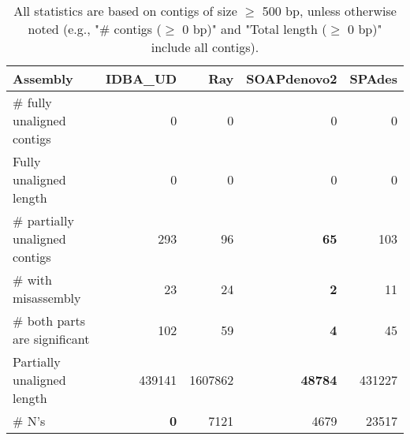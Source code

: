 \documentclass[12pt,a4paper]{article}
\begin{document}
\begin{table}[ht]
\begin{center}
\caption{All statistics are based on contigs of size $\geq$ 500 bp, unless otherwise noted (e.g., "\# contigs ($\geq$ 0 bp)" and "Total length ($\geq$ 0 bp)" include all contigs).}
\begin{tabular}{|l*{4}{|r}|}
\hline
Assembly & IDBA\_UD & Ray & SOAPdenovo2 & SPAdes \\ \hline
\# fully unaligned contigs & 0 & 0 & 0 & 0 \\ \hline
Fully unaligned length & 0 & 0 & 0 & 0 \\ \hline
\# partially unaligned contigs & 293 & 96 & {\bf 65} & 103 \\ \hline
\hspace{5mm}\# with misassembly & 23 & 24 & {\bf 2} & 11 \\ \hline
\hspace{5mm}\# both parts are significant & 102 & 59 & {\bf 4} & 45 \\ \hline
Partially unaligned length & 439141 & 1607862 & {\bf 48784} & 431227 \\ \hline
\# N's & {\bf 0} & 7121 & 4679 & 23517 \\ \hline
\end{tabular}
\end{center}
\end{table}
\end{document}
